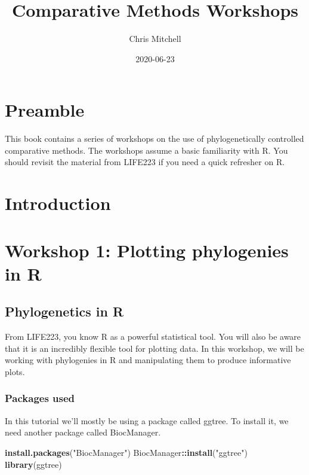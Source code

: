 \documentclass[]{book}
\title{Comparative Methods Workshops}
\author{Chris Mitchell}
\date{2020-06-23}
\newenvironment{Shaded}{\begin{snugshade}}{\end{snugshade}}
\newcommand{\KeywordTok}[1]{\textcolor[rgb]{0.13,0.29,0.53}{\textbf{#1}}}
\newcommand{\StringTok}[1]{\textcolor[rgb]{0.31,0.60,0.02}{#1}}
\newcommand{\OperatorTok}[1]{\textcolor[rgb]{0.81,0.36,0.00}{\textbf{#1}}}
\newcommand{\NormalTok}[1]{#1}
\begin{document}
\maketitle

{
\setcounter{tocdepth}{1}
\tableofcontents
}
\chapter{Preamble}\label{preamble}

This book contains a series of workshops on the use of phylogenetically
controlled comparative methods. The workshops assume a basic familiarity
with R. You should revisit the material from LIFE223 if you need a quick
refresher on R.

\chapter{Introduction}\label{intro}

\chapter{Workshop 1: Plotting phylogenies in R}\label{w1plotting}

\section{Phylogenetics in R}\label{phylogenetics-in-r}

From LIFE223, you know R as a powerful statistical tool. You will also
be aware that it is an incredibly flexible tool for plotting data. In
this workshop, we will be working with phylogenies in R and manipulating
them to produce informative plots.

\subsection{Packages used}\label{packages-used}

In this tutorial we'll mostly be using a package called ggtree. To
install it, we need another package called BiocManager.

\begin{Shaded}
\begin{Highlighting}[]
\KeywordTok{install.packages}\NormalTok{(}\StringTok{"BiocManager"}\NormalTok{)}
\NormalTok{BiocManager}\OperatorTok{::}\KeywordTok{install}\NormalTok{(}\StringTok{"ggtree"}\NormalTok{)}
\KeywordTok{library}\NormalTok{(ggtree)}
\end{Highlighting}
\end{Shaded}
\end{document}
